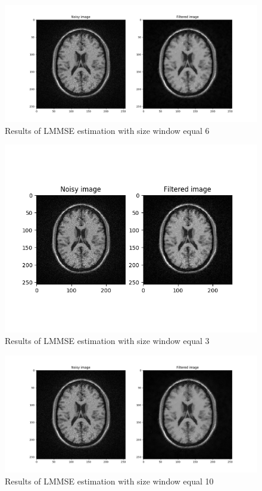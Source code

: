\begin{figure}[H]
\centering{}\includegraphics[scale=0.3]{figures/Module_4/LMMSE_test_win6}\caption{Results of LMMSE estimation with size window equal 6} \label{fig:figures/Module_4/LMMSE_test_win6}
\end{figure}

\begin{figure}[H]
\centering{}\includegraphics[scale=0.7]{figures/Module_4/LMMSE_test_win3}\caption{Results of LMMSE estimation with size window equal 3} \label{fig:figures/Module_4/LMMSE_test_win3}
\end{figure}

\begin{figure}[H]
\centering{}\includegraphics[scale=0.3]{figures/Module_4/LMMSE_test_win10}\caption{Results of LMMSE estimation with size window equal 10} \label{fig:figures/Module_4/LMMSE_test_win10}
\end{figure}